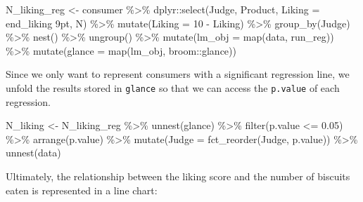 \documentclass[
]{krantz}
\makeatletter
\newenvironment{Shaded}{\begin{snugshade}}{\end{snugshade}}
\newcommand{\AttributeTok}[1]{\textcolor[rgb]{0.61,0.61,0.61}{#1}}
\newcommand{\DecValTok}[1]{\textcolor[rgb]{0.06,0.06,0.06}{#1}}
\newcommand{\FloatTok}[1]{\textcolor[rgb]{0.06,0.06,0.06}{#1}}
\newcommand{\FunctionTok}[1]{\textcolor[rgb]{0,0,0}{#1}}
\newcommand{\NormalTok}[1]{#1}
\newcommand{\OtherTok}[1]{\textcolor[rgb]{0.37,0.37,0.37}{#1}}
\newcommand{\SpecialCharTok}[1]{\textcolor[rgb]{0,0,0}{#1}}
\newcommand{\StringTok}[1]{\textcolor[rgb]{0.5,0.5,0.5}{#1}}
\newenvironment{kframe}{%
\medskip{}
\setlength{\fboxsep}{.8em}
 \def\at@end@of@kframe{}%
 \ifinner\ifhmode%
  \def\at@end@of@kframe{\end{minipage}}%
  \begin{minipage}{\columnwidth}%
 \fi\fi%
 \def\FrameCommand##1{\hskip\@totalleftmargin \hskip-\fboxsep
 \colorbox{shadecolor}{##1}\hskip-\fboxsep
     \hskip-\linewidth \hskip-\@totalleftmargin \hskip\columnwidth}%
 \MakeFramed {\advance\hsize-\width
   \@totalleftmargin\z@ \linewidth\hsize
   \@setminipage}}%
 {\par\unskip\endMakeFramed%
 \at@end@of@kframe}
\renewenvironment{Shaded}{\begin{kframe}}{\end{kframe}}
\makeatother
\begin{document}
\begin{Shaded}
\begin{Highlighting}[]
\NormalTok{N\_liking\_reg }\OtherTok{\textless{}{-}}\NormalTok{ consumer }\SpecialCharTok{\%\textgreater{}\%}
\NormalTok{  dplyr}\SpecialCharTok{::}\FunctionTok{select}\NormalTok{(Judge, Product, }\AttributeTok{Liking =} \StringTok{\textasciigrave{}}\AttributeTok{end\_liking 9pt}\StringTok{\textasciigrave{}}\NormalTok{, N) }\SpecialCharTok{\%\textgreater{}\%}
  \FunctionTok{mutate}\NormalTok{(}\AttributeTok{Liking =} \DecValTok{10} \SpecialCharTok{{-}}\NormalTok{ Liking) }\SpecialCharTok{\%\textgreater{}\%}
  \FunctionTok{group\_by}\NormalTok{(Judge) }\SpecialCharTok{\%\textgreater{}\%}
  \FunctionTok{nest}\NormalTok{() }\SpecialCharTok{\%\textgreater{}\%}
  \FunctionTok{ungroup}\NormalTok{() }\SpecialCharTok{\%\textgreater{}\%}
  \FunctionTok{mutate}\NormalTok{(}\AttributeTok{lm\_obj =} \FunctionTok{map}\NormalTok{(data, run\_reg)) }\SpecialCharTok{\%\textgreater{}\%}
  \FunctionTok{mutate}\NormalTok{(}\AttributeTok{glance =} \FunctionTok{map}\NormalTok{(lm\_obj, broom}\SpecialCharTok{::}\NormalTok{glance))}
\end{Highlighting}
\end{Shaded}

Since we only want to represent consumers with a significant regression line, we unfold the results stored in \texttt{glance} so that we can access the \texttt{p.value} of each regression.

\begin{Shaded}
\begin{Highlighting}[]
\NormalTok{N\_liking }\OtherTok{\textless{}{-}}\NormalTok{ N\_liking\_reg }\SpecialCharTok{\%\textgreater{}\%}
  \FunctionTok{unnest}\NormalTok{(glance) }\SpecialCharTok{\%\textgreater{}\%}
  \FunctionTok{filter}\NormalTok{(p.value }\SpecialCharTok{\textless{}=} \FloatTok{0.05}\NormalTok{) }\SpecialCharTok{\%\textgreater{}\%}
  \FunctionTok{arrange}\NormalTok{(p.value) }\SpecialCharTok{\%\textgreater{}\%}
  \FunctionTok{mutate}\NormalTok{(}\AttributeTok{Judge =} \FunctionTok{fct\_reorder}\NormalTok{(Judge, p.value)) }\SpecialCharTok{\%\textgreater{}\%}
  \FunctionTok{unnest}\NormalTok{(data)}
\end{Highlighting}
\end{Shaded}

Ultimately, the relationship between the liking score and the number of biscuits eaten is represented in a line chart:
\end{document}
